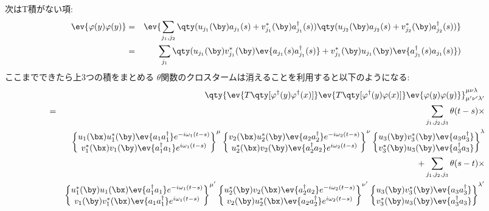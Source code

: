 \documentclass[10.5pt,a4paper]{jreport}
\begin{document}
次はT積がない項:
\begin{eqnarray}
  \ev{\varphi(y)\varphi(y)} &=& \ev{\sum_{j_1, j_2}\qty(u_{j_1}(\by)a_{j_1}(s) + v_{j_1}^*(\by)a_{j_1}^\dagger(s))\qty(u_{j_2}(\by)a_{j_2}(s) + v^*_{j_2}(\by)a^\dagger_{j_2}(s))}\\
  &=& \sum_{j_1}\qty(u_{j_1}(\by)v^*_{j_1}(\by)\ev{a_{j_1}(s)a^\dagger_{j_1}(s)} + v_{j_1}^*(\by)u_{j_1}(\by)\ev{a_{j_1}^\dagger(s)a_{j_1}(s)})
\end{eqnarray}
ここまでできたら上3つの積をまとめる $\theta$関数のクロスタームは消えることを利用すると以下のようになる:
\begin{eqnarray}
  &&\qty{\ev{T\qty[\varphi^\dagger(y)\varphi^\dagger(x)]}\ev{T\qty[\varphi^\dagger(y)\varphi(x)]}\ev{\varphi(y)\varphi(y)}}^{\mu\nu\lambda}_{\mu'\nu'\lambda'}\\
  \nonumber  &=& \sum_{j_1, j_2, j_3}\theta(t-s)\times\\
  \nonumber  &&\begin{Bmatrix}
    u_{1}(\bx)u_{1}^*(\by)\ev{a_{1}a_{1}^\dagger}e^{-i\omega_1(t-s)}\\
    v_{1}^*(\bx)v_{1}(\by)\ev{a_{1}^\dagger a_{1}}e^{i\omega_1(t-s)}
  \end{Bmatrix}^\mu
  \begin{Bmatrix}
    v_{2}(\bx)u^*_{2}(\by)\ev{a_{2}a_{2}^\dagger}e^{-i\omega_2(t-s)}\\
    u^*_{2}(\bx)v_{2}(\by)\ev{a_{2}^\dagger a_{2}}e^{i\omega_2(t-s)}
  \end{Bmatrix}^\nu
  \begin{Bmatrix}
    u_{3}(\by)v^*_{3}(\by)\ev{a_{3}a^\dagger_{3}}\\
    v_{3}^*(\by)u_{3}(\by)\ev{a_{3}^\dagger a_{3}}
  \end{Bmatrix}^\lambda\\
  \nonumber  &&+ \sum_{j_1, j_2, j_3}\theta(s-t)\times\\
  \nonumber  &&\begin{Bmatrix}
    u_{1}^*(\by)u_{1}(\bx)\ev{a_{1}^\dagger a_{1}}e^{-i\omega_1(t-s)}\\
    v_{1}(\by)v_{1}^*(\bx)\ev{a_{1}a_{1}^\dagger}e^{i\omega_1(t-s)}
  \end{Bmatrix}^{\mu'}
  \begin{Bmatrix}
    u^*_{2}(\by)v_{2}(\bx)\ev{a_{2}^\dagger a_{2}}e^{-i\omega_2(t-s)}\\
    v_{2}(\by)u^*_{2}(\bx)\ev{a_{2}a_{2}^\dagger}e^{i\omega_2(t-s)}
  \end{Bmatrix}^{\nu'}
  \begin{Bmatrix}
    u_{3}(\by)v^*_{3}(\by)\ev{a_{3}a^\dagger_{3}}\\
    v_{3}^*(\by)u_{3}(\by)\ev{a_{3}^\dagger a_{3}}
  \end{Bmatrix}^{\lambda'}\\
\end{eqnarray}
\end{document}
